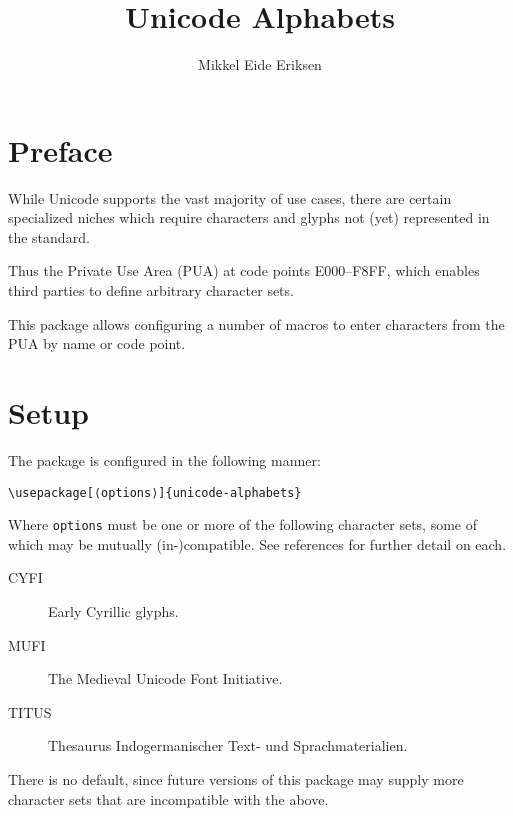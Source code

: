 \documentclass{article}
\title{Unicode Alphabets}
\author{Mikkel Eide Eriksen}
\begin{document}
\maketitle

\section{Preface}

While Unicode supports the vast majority of use cases, there are certain specialized niches which require characters and glyphs not (yet) represented in the standard.

Thus the Private Use Area (PUA) at code points E000--F8FF, which enables third parties to define arbitrary character sets.

This package allows configuring a number of macros to enter characters from the PUA by name or code point.

\section{Setup}

The package is configured in the following manner:

\begin{verbatim}
\usepackage[⟨options⟩]{unicode-alphabets}
\end{verbatim}

Where \verb|options| must be one or more of the following character sets, some of which may be mutually (in-)compatible. See references for further detail on each.

\begin{description}

\item[CYFI] Early Cyrillic glyphs.
\item[MUFI] The Medieval Unicode Font Initiative.
\item[TITUS] Thesaurus Indogermanischer Text- und Sprachmaterialien.

\end{description}

There is no default, since future versions of this package may supply more character sets that are incompatible with the above.
\end{document}
